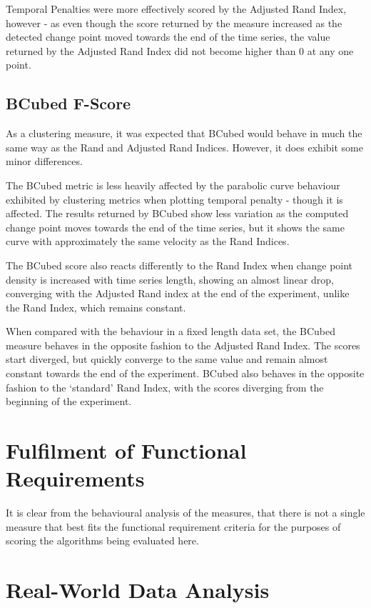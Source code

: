 \documentclass{uvamscse}	%
\begin{document}
Temporal Penalties were more effectively scored by the Adjusted Rand Index, however - as even though the score returned by the measure increased as the detected change point moved towards the end of the time series, the value returned by the Adjusted Rand Index did not become higher than 0 at any one point.

\subsection{BCubed F-Score}

As a clustering measure, it was expected that BCubed would behave in much the same way as the Rand and Adjusted Rand Indices. However, it does exhibit some minor differences.

The BCubed metric is less heavily affected by the parabolic curve behaviour exhibited by clustering metrics when plotting temporal penalty - though it is affected. The results returned by BCubed show less variation as the computed change point moves towards the end of the time series, but it shows the same curve with approximately the same velocity as the Rand Indices.

The BCubed score also reacts differently to the Rand Index when change point density is increased with time series length, showing an almost linear drop, converging with the Adjusted Rand index at the end of the experiment, unlike the Rand Index, which remains constant.

When compared with the behaviour in a fixed length data set, the BCubed measure behaves in the opposite fashion to the Adjusted Rand Index. The scores start diverged, but quickly converge to the same value and remain almost constant towards the end of the experiment. BCubed also behaves in the opposite fashion to the `standard' Rand Index, with the scores diverging from the beginning of the experiment.

\section{Fulfilment of Functional Requirements}

It is clear from the behavioural analysis of the measures, that there is not a single measure that best fits the functional requirement criteria for the purposes of scoring the algorithms being evaluated here.

\section{Real-World Data Analysis}
\end{document}
